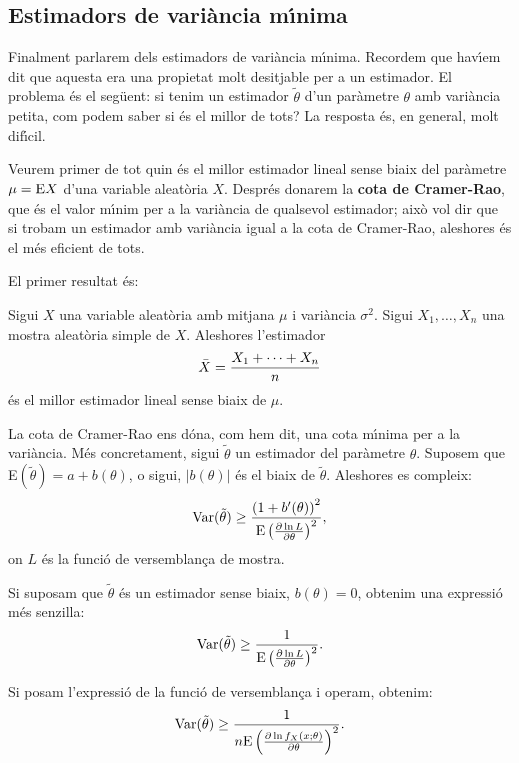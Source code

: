 \subsection{Estimadors de vari\`ancia m\'{\i}nima}

Finalment parlarem dels estimadors de vari\`ancia m\'{\i}nima. 
Recordem que hav\'{\i}em dit que aquesta era una propietat molt desitjable 
per a un estimador. El problema \'es el seg\"uent: si tenim un estimador 
$\tilde{\theta}$ d'un par\`ametre $\theta$ amb
vari\`ancia petita, com podem saber si \'es el millor de tots? La resposta \'es, en
general, molt dif\'{\i}cil.

Veurem primer de tot quin \'es el millor estimador lineal sense biaix del
par\`ametre $\mu = {\rm E}X$ d'una variable aleat\`oria $X$. Despr\'es donarem la {\bf
cota de Cramer-Rao}, que \'es el valor m\'{\i}nim per a la vari\`ancia de qualsevol
estimador; aix\`o vol dir que si trobam un estimador amb vari\`ancia igual a la cota
de Cramer-Rao, aleshores \'es el m\'es eficient de tots.

El primer resultat \'es:
\begin{proposition}
Sigui $X$ una variable aleat\`oria amb mitjana $\mu$ i vari\`ancia
$\sigma^2$. Sigui $X_1, \ldots , X_n$ una mostra aleat\`oria simple de $X$.
Aleshores l'estimador
$$\bar{X} = {X_1 + \cdots + X_n \over n}$$
\'es el millor estimador lineal sense biaix de $\mu$.
\end{proposition}

La cota de Cramer-Rao ens d\'ona, com hem dit, una cota m\'{\i}nima 
per a la vari\`ancia.
M\'es concretament, sigui $\tilde{\theta}$ un estimador del par\`ametre $\theta$.
Suposem que E$(\tilde{\theta}) = a + b(\theta)$, o sigui, $|b(\theta)|$ \'es el
biaix de $\tilde{\theta}$. Aleshores es compleix:
$${\rm Var}(\tilde{\theta}) \geq {\left(1 + b'(\theta)\right)^2 \over {\rm E}
\left({\partial \ln L \over \partial \theta} \right)^2},$$
on $L$ \'es la funci\'o de versemblan\c ca de mostra.

Si suposam que $\tilde{\theta}$ \'es un estimador sense biaix, $b(\theta) = 0$, 
obtenim una expressi\'o m\'es senzilla:
$${\rm Var}(\tilde{\theta}) \geq {1 \over {\rm E} \left({\partial \ln L \over \partial
\theta} \right)^2}.$$

Si posam l'expressi\'o de la funci\'o de versemblan\c ca i operam, obtenim:
$${\rm Var}(\tilde{\theta}) \geq {1 \over n {\rm E} \left({\partial \ln f_X(x;
\theta)\over \partial \theta} \right)^2}.$$

